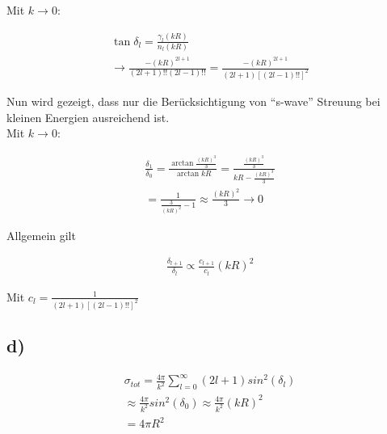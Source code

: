 Mit $k \rightarrow 0$:

\begin{align}
\tan{\delta_l} = \frac{\gamma_l\left(kR\right) }{n_l\left(kR\right) } \\
\rightarrow
\frac{-\left(kR\right)^{2l+1}}{\left(2l+1\right)!!\left(2l-1\right)!!}
=
\frac{-\left(kR\right)^{2l+1}}{\left(2l+1\right)\left[\left(2l-1\right)!!\right]^2}
\end{align}

Nun wird gezeigt, dass nur die Ber\"ucksichtigung von ``s-wave'' Streuung bei
kleinen Energien ausreichend ist.\\
Mit $k \rightarrow 0$:

\begin{align}
\frac{\delta_1}{\delta_0} =
\frac{\arctan{\frac{\left(kR\right)^3}{3}}}{\arctan{kR}} =
\frac{\frac{\left(kR\right)^3}{3}}{kR-\frac{\left(kR\right)^3}{3}} \\
= \frac{1}{\frac{3}{\left(kR\right)^2}-1} \approx \frac{\left(kR\right)^2}{3}
\rightarrow 0
\end{align}

Allgemein gilt

\begin{align}
\frac{\delta_{l+1}}{\delta_l} \propto \frac{c_{l+1}}{c_l} \left(kR\right)^2
\end{align}

Mit $c_l = \frac{1}{\left(2l+1\right)\left[\left(2l-1\right)!! \right]^2}$

\subsection{d)}

\begin{align}
\sigma_{tot} = \frac{4\pi}{k^2} \sum_{l=0}^{\infty} \left(2l+1\right) sin^2
\left(\delta_l\right) \\
\approx \frac{4\pi}{k^2} sin^2 \left(\delta_0\right) \approx \frac{4\pi}{k^2}
\left(kR\right)^2 \\
= 4\pi R^2
\end{align}
